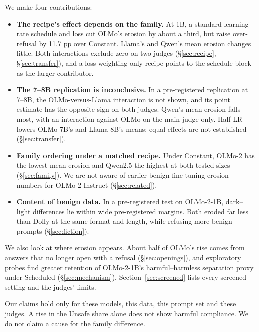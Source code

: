 \documentclass{article}
\begin{document}
We make four contributions:
\begin{itemize}
  \item \textbf{The recipe's effect depends on the family.} At 1B, a standard
        learning-rate schedule and loss cut OLMo's erosion by about a third,
        but raise over-refusal by 11.7 pp over Constant. Llama's and Qwen's
        mean erosion changes little. Both interactions exclude zero on two judges
        (\S\ref{sec:recipe}, \S\ref{sec:transfer}), and a loss-weighting-only
        recipe points to the schedule block as the larger contributor.
  \item \textbf{The 7--8B replication is inconclusive.} In a
        pre-registered replication at 7--8B, the OLMo-versus-Llama interaction
        is not shown, and its point estimate has the opposite sign on both
        judges. Qwen's mean erosion falls most, with an interaction against
        OLMo on the main judge only. Half LR lowers OLMo-7B's and Llama-8B's
        means; equal effects are not established (\S\ref{sec:transfer}).
  \item \textbf{Family ordering under a matched recipe.} Under Constant,
        OLMo-2 has the lowest mean erosion and Qwen2.5 the highest at both
        tested sizes (\S\ref{sec:family}). We are not aware of
        earlier benign-fine-tuning erosion numbers for OLMo-2 Instruct
        (\S\ref{sec:related}).
  \item \textbf{Content of benign data.} In a pre-registered test on
        OLMo-2-1B, dark--light differences lie within wide pre-registered
        margins. Both eroded far less than Dolly at the same format and length, while
        refusing more benign prompts (\S\ref{sec:fiction}).
\end{itemize}

We also look at where erosion appears. About half of OLMo's rise comes from
answers that no longer open with a refusal (\S\ref{sec:openings}), and
exploratory probes find greater retention of OLMo-2-1B's harmful--harmless
separation proxy under Scheduled (\S\ref{sec:mechanism}).
Section~\ref{sec:screened} lists every screened setting and the judges' limits.

Our claims hold only for these models, this data, this prompt set and these
judges. A rise in the Unsafe share alone does not show harmful compliance. We
do not claim a cause for the family difference.
\end{document}
